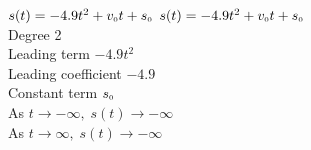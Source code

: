 {$s(t) = -4.9t^{2} + v_{\mbox{\tiny $0$}}t + s_{\mbox{\tiny $0$}}$}
{$s(t) = -4.9t^{2} + v_{\mbox{\tiny $0$}}t + s_{\mbox{\tiny $0$}}$\\
Degree 2 \\
Leading term $-4.9t^{2}$\\
Leading coefficient $-4.9$\\
Constant term $s_{\mbox{\tiny $0$}}$\\
As $t \rightarrow -\infty, \; s(t) \rightarrow -\infty$\\
As $t \rightarrow \infty, \; s(t) \rightarrow -\infty$}